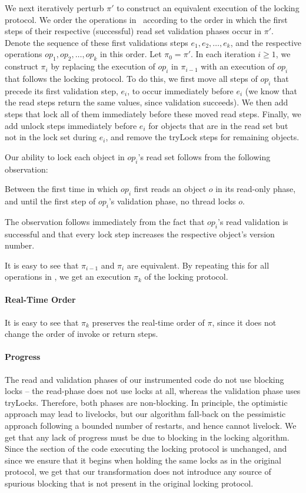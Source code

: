 We next iteratively perturb $\pi'$ to construct an equivalent execution of the locking protocol.
We order the operations in \op\ according to the order in which the first steps of their respective (successful) read set validation phases occur in $\pi'$.
Denote the sequence of these first validations steps $e_1, e_2, \ldots, e_k$, and the respective operations
$op_1, op_2, \ldots, op_k$ in this order. Let $\pi_0 = \pi'$. 
In each iteration $i \geq 1$, we construct $\pi_i$ by replacing the execution of $op_i$
in $\pi_{i-1}$ with an execution of $op_i$ that follows the locking protocol. To do this, we first move all steps of $op_i$ that precede 
its first validation step, $e_i$, to occur immediately before $e_i$ (we know that the read steps return the same values, since validation 
succeeds). We then add steps that lock all of them immediately before these moved read steps. Finally, we add unlock steps immediately
before $e_i$ for objects that are in the read set but not in the lock set during $e_i$, and remove the tryLock steps for remaining objects. 

Our ability to lock each object in $op_i$'s read set follows from the following observation:
\begin{observation}
Between the first time in which $op_i$ first reads an object $o$ in its read-only phase, and until the first step of $op_i$'s validation phase, no
 thread locks $o$. 
\end{observation}
The observation follows immediately from the fact that $op_i$'s read validation is successful and that every lock step increases the
respective object's version number. 

It is easy to see that $\pi_{i-1}$ and $\pi_i$ are equivalent. By repeating this for all operations in \op, we get an execution $\pi_k$ of the locking 
protocol.

\paragraph{Real-Time Order}
It is easy to see that $\pi_k$ preserves the real-time order of $\pi$, since it does not change the order of invoke or return steps. 

\paragraph{Progress}
The read and validation phases of our instrumented code do not use blocking locks -- the read-phase does not use locks at all, whereas the 
validation phase uses tryLocks. Therefore, both phases are non-blocking. In principle, the optimistic approach may lead to livelocks, but 
our algorithm fall-back on the pessimistic approach following a bounded number of restarts, and hence cannot livelock. We get that any lack
of progress must be due to blocking in the locking algorithm. Since the section of the code executing the locking protocol is unchanged, and
since we ensure that it begins when holding the same locks as in the original protocol, we get that our transformation does not introduce any
source of spurious blocking that is not present in the original locking protocol. 




